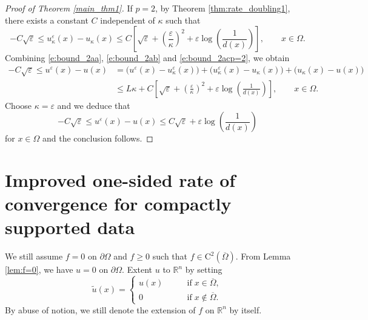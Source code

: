 \documentclass[12pt,reqno]{amsart}
\numberwithin{figure}{section}
\theoremstyle{plain}
\theoremstyle{remark}
\numberwithin{equation}{section}
\newcommand{\R}{\mathbb{R}}
\newcommand{\rmC}{\mathrm{C}}
\begin{document}
\begin{proof}[Proof of Theorem \ref{main_thm1}]
\noindent If $p=2$, by Theorem \ref{thm:rate_doubling1}, there exists a constant $C$ independent of $\kappa$ such that
\begin{equation}\label{e:bound_2acp=2}
    -C\sqrt{\varepsilon}\leq u^\varepsilon_\kappa(x) - u_\kappa(x) \leq C\left[\sqrt{\varepsilon} + \left(\frac{\varepsilon}{\kappa}\right)^2 + \varepsilon\log\left(\frac{1}{d(x)}\right)\right], \qquad x\in \Omega.
\end{equation}
Combining \eqref{e:bound_2aa}, \eqref{e:bound_2ab} and \eqref{e:bound_2acp=2}, we obtain
\begin{equation*}
\begin{split}
   -C\sqrt{\varepsilon}\leq u^\varepsilon(x) - u(x) &= \Big(u^\varepsilon(x) - u^\varepsilon_\kappa(x)\Big) + \Big(u^\varepsilon_\kappa(x) - u_\kappa(x)\Big) + \Big(u_\kappa(x) - u(x)\Big) \\
    &\leq L\kappa + C\left[\sqrt{\varepsilon} +  \left(\frac{\varepsilon}{\kappa}\right)^{2} + \varepsilon\log\left(\frac{1}{d(x)}\right) \right], \qquad x\in \Omega.
\end{split}
\end{equation*}
Choose $\kappa = \varepsilon$ and we deduce that
\begin{equation*}
    -C\sqrt{\varepsilon}\leq u^\varepsilon(x) - u(x) \leq C\sqrt{\varepsilon} +\varepsilon\log\left(\frac{1}{d(x)}\right)
\end{equation*}
for $x\in \Omega$ and the conclusion follows. 
\end{proof}


\section{Improved one-sided rate of convergence for compactly supported data}
We still assume $f = 0$ on $\partial\Omega$ and $f\geq 0$ such that $f\in \rmC^2(\overline{\Omega})$. From Lemma \ref{lem:f=0}, we have $u = 0$ on $\partial\Omega$. Extent $u$ to $\R^n$ by setting 
\begin{equation*}
    \tilde{u}(x) = \begin{cases}
      u(x) &\qquad\text{if}\;x\in \overline{\Omega},\\
      0 &\qquad\text{if}\;x\notin \overline{\Omega}.
    \end{cases}
\end{equation*}
By abuse of notion, we still denote the extension of $f$ on $\R^n$ by itself.
\end{document}
